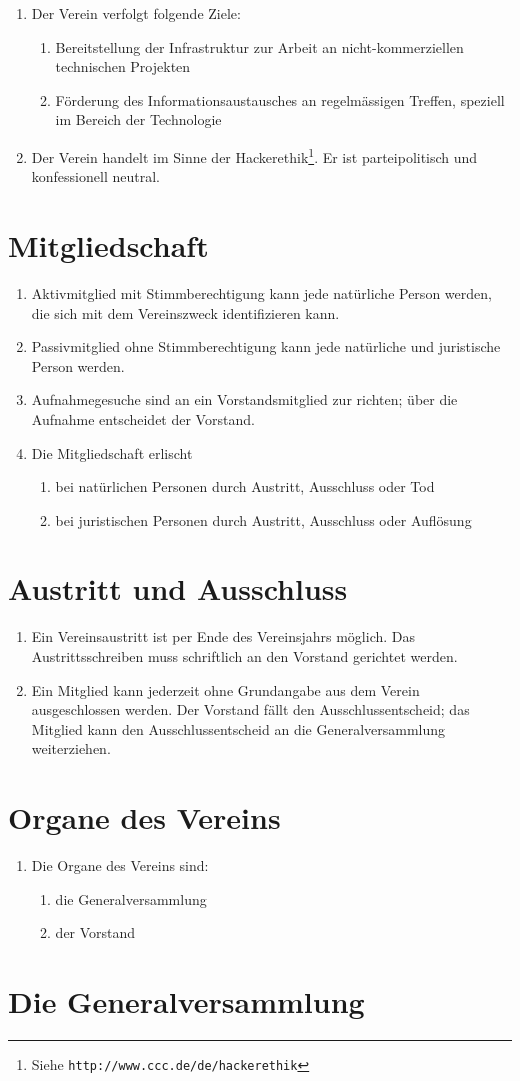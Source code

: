 \documentclass[10pt,a4paper,parskip,fleqn]{scrartcl}
\newcommand{\ol}{\begin{enumerate}[itemsep=-0.2em,topsep=-0.2em]}
\newcommand{\lo}{\end{enumerate}}
\newcommand{\li}{\item}
\begin{document}
\ol
	\li Der Verein verfolgt folgende Ziele:
    \ol
      \li Bereitstellung der Infrastruktur zur Arbeit an nicht-kommerziellen
			technischen Projekten
      \li Förderung des Informationsaustausches an regelmässigen Treffen,
			speziell im Bereich der Technologie
    \lo
		\li Der Verein handelt im Sinne der
		Hackerethik\footnote{Siehe \texttt{http://www.ccc.de/de/hackerethik}}. Er
		ist parteipolitisch und konfessionell neutral.
\lo


\section{Mitgliedschaft}

\ol
  \li Aktivmitglied mit Stimmberechtigung kann jede natürliche Person werden,
	die sich mit dem Vereinszweck identifizieren kann.
	\li Passivmitglied ohne Stimmberechtigung kann jede natürliche und juristische
	Person werden.
	\li Aufnahmegesuche sind an ein Vorstandsmitglied zur richten; über die
	Aufnahme entscheidet der Vorstand.
	\li Die Mitgliedschaft erlischt
		\ol
			\li bei natürlichen Personen durch Austritt, Ausschluss oder Tod
			\li bei juristischen Personen durch Austritt, Ausschluss oder Auflösung
		\lo
\lo


\section{Austritt und Ausschluss}

\ol
	\li Ein Vereinsaustritt ist per Ende des Vereinsjahrs möglich. Das
	Austrittsschreiben muss schriftlich an den Vorstand gerichtet werden.
	\li Ein Mitglied kann jederzeit ohne Grundangabe aus dem Verein ausgeschlossen
	werden. Der Vorstand fällt den Ausschlussentscheid; das Mitglied kann den
	Ausschlussentscheid an die Generalversammlung weiterziehen.
\lo


\section{Organe des Vereins}

\ol
	\li Die Organe des Vereins sind:
		\ol
			\li die Generalversammlung
			\li der Vorstand
		\lo
\lo


\section{Die Generalversammlung}
\end{document}
